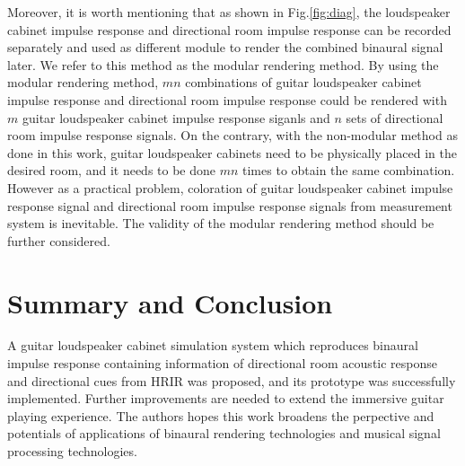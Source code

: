 \documentclass[convention,e-brief]{aesconf-current}
\begin{document}
Moreover, it is worth mentioning that as shown in Fig.\ref{fig:diag}, the loudspeaker cabinet impulse response and directional room impulse response can be recorded separately and used as different module to render the combined binaural signal later.
We refer to this method as the modular rendering method.
By using the modular rendering method, $mn$ combinations of guitar loudspeaker cabinet impulse response and directional room impulse response could be rendered with $m$ guitar loudspeaker cabinet impulse response siganls and $n$ sets of directional room impulse response signals.
On the contrary, with the non-modular method as done in this work, guitar loudspeaker cabinets need to be physically placed in the desired room, and it needs to be done $mn$ times to obtain the same combination.
However as a practical problem, coloration of guitar loudspeaker cabinet impulse response signal and directional room impulse response signals from measurement system is inevitable.
The validity of the modular rendering method should be further considered.

\section{Summary and Conclusion}

A guitar loudspeaker cabinet simulation system which reproduces binaural impulse response containing information of directional room acoustic response and directional cues from HRIR was proposed, and its prototype was successfully implemented.
Further improvements are needed to extend the immersive guitar playing experience.
The authors hopes this work broadens the perpective and potentials of applications of binaural rendering technologies and musical signal processing technologies.





\end{document}
